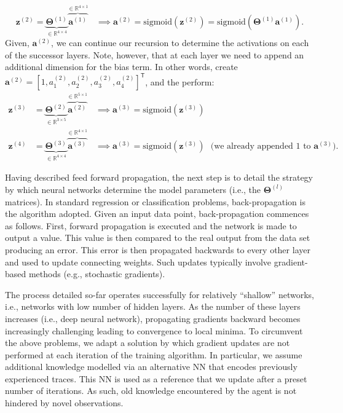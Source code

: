\begin{equation*}
\bm{z}^{(2)} = \underbrace{\bm{\Theta}^{(1)}}_{\in \mathbb{R}^{4 \times 4}}\overbrace{\bm{a}^{(1)}}^{\in \mathbb{R}^{4 \times 1}} \ \ \ \ \implies \bm{a}^{(2)} =\text{sigmoid}(\bm{z}^{(2)}) = \text{sigmoid}\left(\bm{\Theta}^{(1)}\bm{a}^{(1)}\right). 
\end{equation*}
Given, $\bm{a}^{(2)}$, we can continue our recursion to determine the activations on each of the successor layers. Note, however, that at each layer we need to append an additional dimension for the bias term. In other words, create $\bm{a}^{(2)} = [1, a^{(2)}_{1}, a^{(2)}_{2}, a^{(2)}_{3}, a^{(2)}_{4}]^{\mathsf{T}}$, and the perform: 
\begin{align*}
\bm{z}^{(3)} &= \underbrace{\bm{\Theta}^{(2)}}_{\in \mathbb{R}^{3 \times 5}}\overbrace{\bm{a}^{(2)}}^{\in \mathbb{R}^{5 \times 1}} \ \ \ \ \implies \bm{a}^{(3)} = \text{sigmoid}(\bm{z}^{(3)}) \\
\bm{z}^{(4)} &= \underbrace{\bm{\Theta}^{(3)}}_{\in \mathbb{R}^{4 \times 4}}\overbrace{\bm{a}^{(3)}}^{\in \mathbb{R}^{4 \times 1}} \ \ \ \ \implies \bm{a}^{(3)} = \text{sigmoid}(\bm{z}^{(3)}) \ \ \ \text{(we already appended 1 to $\bm{a}^{(3)}$)}.
\end{align*}



Having described feed forward propagation, the next step is to detail the strategy by which neural networks determine the model parameters (i.e., the $\bm{\Theta}^{(l)}$ matrices). In standard regression or classification problems, back-propagation is the algorithm adopted. Given an input data point, back-propagation commences as follows. First, forward propagation is executed and the network is made to output a value. This value is then compared to the real output from the data set producing an error. This error is then propagated backwards to every other layer and used to update connecting weights. Such updates typically involve gradient-based methods (e.g., stochastic gradients). 

The process detailed so-far operates successfully for relatively ``shallow'' networks, i.e., networks with low number of hidden layers. As the number of these layers increases (i.e., deep neural network), propagating gradients backward becomes increasingly challenging leading to convergence to local minima. To circumvent the above problems, we adapt a solution by which gradient updates are not performed at each iteration of the training algorithm. In particular, we assume additional knowledge modelled via an alternative NN that encodes previously experienced traces. This NN is used as a reference that we update after a preset number of iterations. As such, old knowledge encountered by the agent is not hindered by novel observations. 
